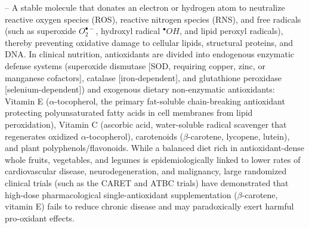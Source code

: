 -- A stable molecule that donates an electron or hydrogen atom to neutralize reactive oxygen species (ROS), reactive nitrogen species (RNS), and free radicals (such as superoxide $O_2^{\bullet-}$, hydroxyl radical $^{\bullet}OH$, and lipid peroxyl radicals), thereby preventing oxidative damage to cellular lipids, structural proteins, and DNA. In clinical nutrition, antioxidants are divided into endogenous enzymatic defense systems (superoxide dismutase [SOD, requiring copper, zinc, or manganese cofactors], catalase [iron-dependent], and glutathione peroxidase [selenium-dependent]) and exogenous dietary non-enzymatic antioxidants: Vitamin E ($\alpha$-tocopherol, the primary fat-soluble chain-breaking antioxidant protecting polyunsaturated fatty acids in cell membranes from lipid peroxidation), Vitamin C (ascorbic acid, water-soluble radical scavenger that regenerates oxidized $\alpha$-tocopherol), carotenoids ($\beta$-carotene, lycopene, lutein), and plant polyphenols/flavonoids. While a balanced diet rich in antioxidant-dense whole fruits, vegetables, and legumes is epidemiologically linked to lower rates of cardiovascular disease, neurodegeneration, and malignancy, large randomized clinical trials (such as the CARET and ATBC trials) have demonstrated that high-dose pharmacological single-antioxidant supplementation ($\beta$-carotene, vitamin E) fails to reduce chronic disease and may paradoxically exert harmful pro-oxidant effects.

